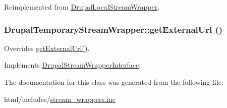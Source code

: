 Reimplemented from \hyperlink{classDrupalLocalStreamWrapper_a3ff87a4643479303f4880f2381d0f432}{DrupalLocalStreamWrapper}.\hypertarget{classDrupalTemporaryStreamWrapper_a289ebf62f0ba1a495cb7682812abba05}{
\subsubsection[{getExternalUrl}]{\setlength{\rightskip}{0pt plus 5cm}DrupalTemporaryStreamWrapper::getExternalUrl ()}}
\label{classDrupalTemporaryStreamWrapper_a289ebf62f0ba1a495cb7682812abba05}
Overrides \hyperlink{classDrupalTemporaryStreamWrapper_a289ebf62f0ba1a495cb7682812abba05}{getExternalUrl()}. 

Implements \hyperlink{interfaceDrupalStreamWrapperInterface_af8474357b8c79f1a7629084a05541d16}{DrupalStreamWrapperInterface}.

The documentation for this class was generated from the following file:\begin{DoxyCompactItemize}
\item 
html/includes/\hyperlink{stream__wrappers_8inc}{stream\_\-wrappers.inc}\end{DoxyCompactItemize}
